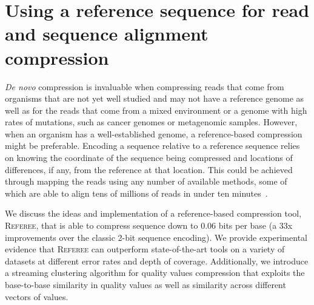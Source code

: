 \documentclass[12pt]{cmuthesis}
\newcommand{\refer}{\textsc{Referee}\xspace}
\begin{document}



\chapter{Using a reference sequence for read and sequence alignment compression}
\label{chapter:referee}

\textit{De novo} compression is invaluable when compressing reads that come from organisms that are not yet well studied and may not have a reference genome as well as for the reads that come from a mixed environment or a genome with high rates of mutations, such as cancer genomes or metagenomic samples. However, when an organism has a well-established genome, a reference-based compression might be preferable. Encoding a sequence relative to a reference sequence relies on knowing the coordinate of the sequence being compressed and locations of differences, if any, from the reference at that location. This could be achieved through mapping the reads using any number of available methods, some of which are able to align tens of millions of reads in under ten minutes~\cite{DobinSTAR}. 


We discuss the ideas and implementation of a reference-based compression tool, \refer, that is able to compress sequence down to 0.06 bits per base (a 33x improvements over the classic 2-bit sequence encoding). We provide experimental evidence that \refer can outperform state-of-the-art tools on a variety of datasets at different error rates and depth of coverage. Additionally, we introduce a streaming clustering algorithm for quality values compression that exploits the base-to-base similarity in quality values as well as similarity across different vectors of values.

\end{document}

